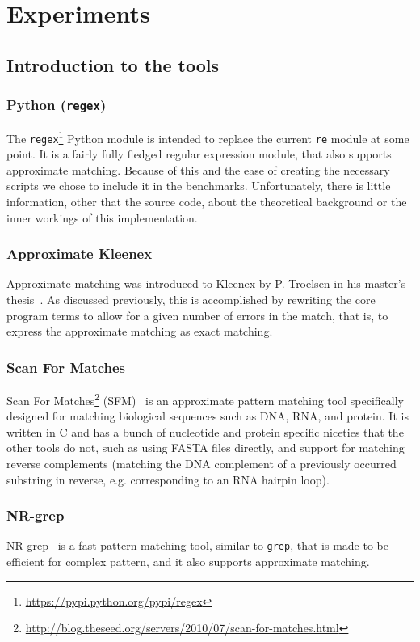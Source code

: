 \section{Experiments}

\subsection{Introduction to the tools}
\subsubsection{Python (\texttt{regex})}
The \texttt{regex}\footnote{\url{https://pypi.python.org/pypi/regex}} Python
module is intended to replace the current \texttt{re} module at some point. It
is a fairly fully fledged regular expression module, that also supports
approximate matching. Because of this and the ease of creating the necessary
scripts we chose to include it in the benchmarks. Unfortunately, there is
little information, other that the source code, about the theoretical
background or the inner workings of this implementation.

\subsubsection{Approximate Kleenex}
Approximate matching was introduced to Kleenex by P. Troelsen in his master's
thesis~\cite{troelsen2016approximate}. As discussed previously, this is
accomplished by rewriting the core program terms to allow for a given number of
errors in the match, that is, to express the approximate matching as exact
matching.

\subsubsection{Scan For Matches}
Scan For Matches\footnote{\url{http://blog.theseed.org/servers/2010/07/scan-for-matches.html}}
(SFM)~\cite{dsouza1997searching} is an approximate pattern matching tool
specifically designed for matching biological sequences such as DNA, RNA, and
protein. It is written in C and has a bunch of nucleotide and protein specific
niceties that the other tools do not, such as using FASTA files directly, and
support for matching reverse complements (matching the DNA complement of a
previously occurred substring in reverse, e.g. corresponding to an RNA hairpin
loop).

\subsubsection{NR-grep}
NR-grep~\cite{navarro2001nr} is a fast pattern matching tool, similar to
\texttt{grep}, that is made to be efficient for complex pattern, and it also
supports approximate matching.


